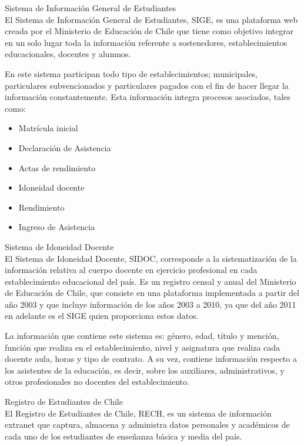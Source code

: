 \begin{longdescription}
\item [Sistema de Información General de Estudiantes] \hfill \\
    El Sistema de Información General de Estudiantes, SIGE, es una plataforma web creada por el Ministerio de Educación de Chile que tiene como objetivo integrar en un solo lugar toda la información referente a sostenedores, establecimientos educacionales, docentes y alumnos. 
    
    En este sistema participan todo tipo de establecimientos; municipales, particulares subvencionados y particulares pagados con el fin de hacer llegar la información constantemente. 
    Esta información integra procesos asociados, tales como:
    \begin{itemize}
        \item Matrícula inicial
        \item Declaración de Asistencia
        \item Actas de rendimiento 
        \item Idoneidad docente
        \item Rendimiento 
        \item Ingreso de Asistencia
    \end{itemize}
\item [Sistema de Idoneidad Docente] \hfill \\
    El Sistema de Idoneidad Docente, SIDOC, corresponde a la sistematización de la información relativa al cuerpo docente en ejercicio profesional en cada establecimiento educacional del país. Es un registro censal y anual del Ministerio de Educación de Chile, que consiste en una plataforma implementada a partir del año 2003 y que incluye información de los años 2003 a 2010, ya que del año 2011 en adelante es el SIGE quien proporciona estos datos.
    
    La información que contiene este sistema es: género, edad, título y mención, función que realiza en el establecimiento, nivel y asignatura que realiza cada docente aula, horas y tipo de contrato. A su vez, contiene información respecto a los asistentes de la educación, es decir, sobre los auxiliares, administrativos, y otros profesionales no docentes del establecimiento. 
\item [Registro de Estudiantes de Chile] \hfill \\
    El Registro de Estudiantes de Chile, RECH, es un sistema de información extranet que captura, almacena y administra datos personales y académicos de cada uno de los estudiantes de enseñanza básica y media del país. 
    

\end{longdescription}
